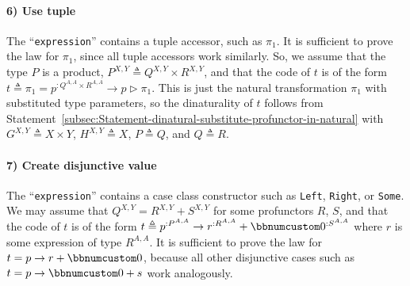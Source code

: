 \paragraph{6) Use tuple }

The \textsf{``}\lstinline!expression!\textsf{''} contains a tuple accessor, such
as $\pi_{1}$. It is sufficient to prove the law for $\pi_{1}$, since
all tuple accessors work similarly. So, we assume that the type $P$
is a product, $P^{X,Y}\triangleq Q^{X,Y}\times R^{X,Y}$, and that
the code of $t$ is of the form $t\triangleq\pi_{1}=p^{:Q^{A,A}\times R^{A,A}}\rightarrow p\triangleright\pi_{1}$.
This is just the natural transformation $\pi_{1}$ with substituted
type parameters, so the dinaturality of $t$ follows from Statement~\ref{subsec:Statement-dinatural-substitute-profunctor-in-natural}
with $G^{X,Y}\triangleq X\times Y$, $H^{X,Y}\triangleq X$, $P\triangleq Q$,
and $Q\triangleq R$.

\paragraph{7) Create disjunctive value }

The \textsf{``}\lstinline!expression!\textsf{''} contains a case class constructor
such as \lstinline!Left!, \lstinline!Right!, or \lstinline!Some!.
We may assume that $Q^{X,Y}=R^{X,Y}+S^{X,Y}$ for some profunctors
$R$, $S$, and that the code of $t$ is of the form $t\triangleq p^{:P^{A,A}}\rightarrow r^{:R^{A,A}}+\bbnum 0^{:S^{A,A}}$
where $r$ is some expression of type $R^{A,A}$. It is sufficient
to prove the law for $t=p\rightarrow r+\bbnum 0$, because all other
disjunctive cases such as $t=p\rightarrow\bbnum 0+s$ work analogously.

